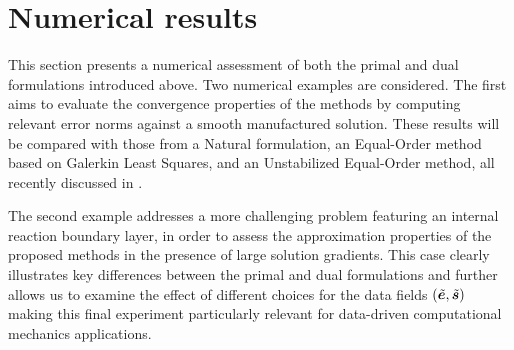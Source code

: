 
\section{Numerical results}

This section presents a numerical assessment of both the primal and dual formulations introduced above. Two numerical examples are considered. The first aims to evaluate the convergence properties of the methods by computing relevant error norms against a smooth manufactured solution. These results will be compared with those from a Natural formulation, an Equal-Order method based on Galerkin Least Squares, and an Unstabilized Equal-Order method, all recently discussed in \cite{ddcm1_article_gus}.

The second example addresses a more challenging problem featuring an internal reaction boundary layer, in order to assess the approximation properties of the proposed methods in the presence of large solution gradients. This case clearly illustrates key differences between the primal and dual formulations and further allows us to examine the effect of different choices for the data fields $(\tilde{\bm{e}},\tilde{\bm{s}})$ making this final experiment particularly relevant for data-driven computational mechanics applications.

